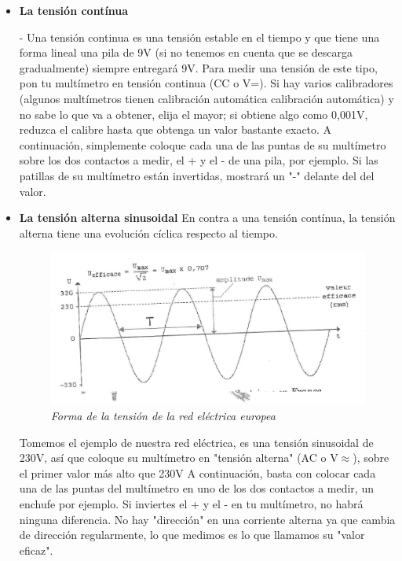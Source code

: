 \documentclass[a5paper,twoside,openany]{book}
\newenvironment{normalize}{\leftskip-\leftmargin}{\par}
\begin{document}
\begin{itemize}
\item \textbf{La tensión contínua}

\begin{normalize}
Una tensión continua es una tensión estable en el tiempo y que tiene una forma lineal
una pila de 9V (si no tenemos en cuenta que se descarga gradualmente) siempre entregará 9V. 
Para medir una tensión de este tipo, pon tu multímetro en tensión continua
(CC o V=). Si hay varios calibradores (algunos multímetros tienen calibración automática
calibración automática) y no sabe lo que va a obtener, elija el mayor; si obtiene algo como 0,001V, reduzca el calibre hasta que obtenga un valor bastante exacto.
A continuación, simplemente coloque cada una de las puntas de su multímetro sobre los dos contactos a medir, el + y el - de una pila, por ejemplo.
Si las patillas de su multímetro están invertidas, mostrará un "-" delante del
del valor.
\end{normalize}

\newpage


\item \textbf{La tensión alterna sinusoidal}
En contra a una tensión contínua, la tensión alterna tiene una evolución cíclica respecto al tiempo.

\begin{figure}[h]
\includegraphics[width=\textwidth]{tension-alterna-sinusoidal} 
\centering
\caption*{\textit{Forma de la tensión de la red eléctrica europea}}
\end{figure}
Tomemos el ejemplo de nuestra red eléctrica, es una tensión sinusoidal de 230V, así que coloque su multímetro en "tensión alterna" (AC o V$\approx$), sobre el primer valor más alto que 230V
A continuación, basta con colocar cada una de las puntas del multímetro en uno de los dos contactos a medir, un enchufe por ejemplo. Si inviertes el + y el - en tu multímetro, no habrá ninguna diferencia. No hay "dirección" en una corriente alterna ya que cambia de dirección regularmente, lo que medimos es lo que llamamos su "valor eficaz".


\end{itemize}
\end{document}
